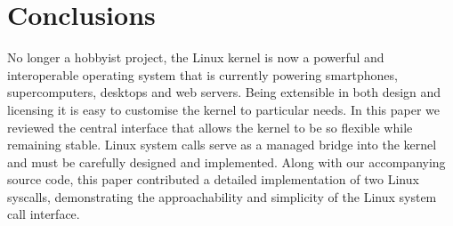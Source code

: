 \documentclass{article}
\begin{document}
\section{Conclusions}
No longer a hobbyist project,
the Linux kernel is now a powerful and interoperable operating system that is currently 
powering smartphones, supercomputers, desktops and web servers. 
Being extensible in both design and licensing it is easy 
to customise the kernel to particular needs. In this paper we reviewed 
the central interface that allows the kernel to be so flexible while remaining stable.
Linux system calls serve as a managed bridge into the kernel and must be carefully 
designed and implemented. Along with our accompanying source code, this paper
contributed a detailed implementation of two Linux syscalls,
demonstrating the approachability and simplicity of the Linux system call interface.



\vspace{-7.5mm}
\renewcommand{\refname}{\section{References}}

\end{document}
